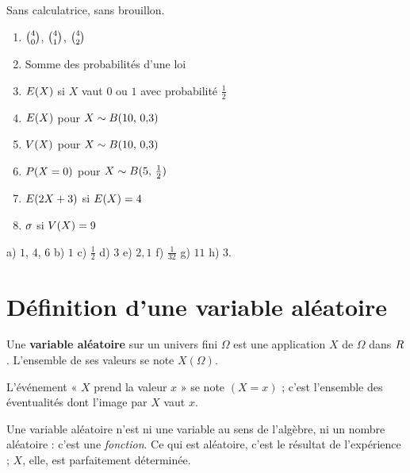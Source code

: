 \begin{automatismes}
Sans calculatrice, sans brouillon.

\begin{enumerate}[label=\textbf{\alph*)}, leftmargin=*, itemsep=0.25em]
  \item $\combi{0}{4}$, $\combi{1}{4}$, $\combi{2}{4}$
  \item Somme des probabilités d'une loi
  \item $\Esp(X)$ si $X$ vaut $0$ ou $1$ avec probabilité $\frac12$
  \item $\Esp(X)$ pour $X \sim \loibin{10}{0{,}3}$
  \item $\Var(X)$ pour $X \sim \loibin{10}{0{,}3}$
  \item $\proba{X = 0}$ pour $X \sim \loibin{5}{\frac12}$
  \item $\Esp(2X+3)$ si $\Esp(X) = 4$
  \item $\ecart$ si $\Var(X) = 9$
\end{enumerate}
\end{automatismes}

\begin{corrige}[automatismes]
a) $1$, $4$, $6$ \quad b) $1$ \quad c) $\frac12$ \quad d) $3$ \quad
e) $2{,}1$ \quad f) $\frac{1}{32}$ \quad g) $11$ \quad h) $3$.
\end{corrige}

\section{Définition d'une variable aléatoire}

\begin{definition}
Une \textbf{variable aléatoire} sur un univers fini $\Omega$ est une
application $X$ de $\Omega$ dans $\R$. L'ensemble de ses valeurs se note
$X(\Omega)$.

L'événement « $X$ prend la valeur $x$ » se note $(X = x)$ ; c'est l'ensemble
des éventualités dont l'image par $X$ vaut $x$.
\end{definition}

\begin{avertissement}
Une variable aléatoire n'est ni une variable au sens de l'algèbre, ni un
nombre aléatoire : c'est une \emph{fonction}. Ce qui est aléatoire, c'est le
résultat de l'expérience ; $X$, elle, est parfaitement déterminée.
\end{avertissement}

